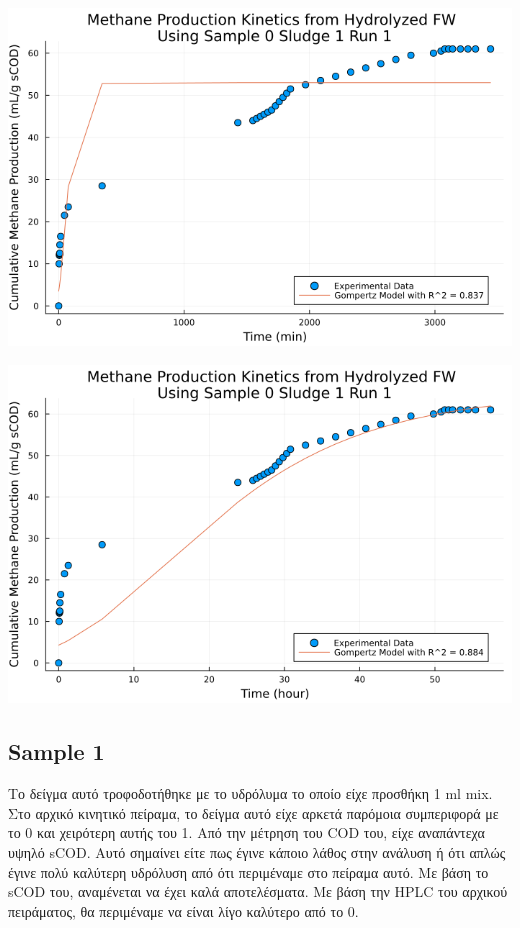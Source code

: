 \documentclass[11pt]{article}
\begin{document}
\begin{center}
\includegraphics[width=.9\linewidth]{../plots/BMPs/Hydrolyzed FW/methane_kinetics_hydrolysate_0_s1_r1_min.png}
\end{center}

\begin{center}
\includegraphics[width=.9\linewidth]{../plots/BMPs/Hydrolyzed FW/methane_kinetics_hydrolysate_0_s1_r1_hour.png}
\end{center}

\subsection{Sample 1}
\label{sec:org1a6b6a6}
Το δείγμα αυτό τροφοδοτήθηκε με το υδρόλυμα το οποίο είχε προσθήκη 1 ml mix. Στο αρχικό κινητικό πείραμα, το δείγμα αυτό είχε αρκετά παρόμοια συμπεριφορά με το 0 και χειρότερη αυτής του 1. Από την μέτρηση του COD του, είχε αναπάντεχα υψηλό sCOD. Αυτό σημαίνει είτε πως έγινε κάποιο λάθος στην ανάλυση ή ότι απλώς έγινε πολύ καλύτερη υδρόλυση από ότι περιμέναμε στο πείραμα αυτό. Με βάση το sCOD του, αναμένεται να έχει καλά αποτελέσματα. Με βάση την HPLC του αρχικού πειράματος, θα περιμέναμε να είναι λίγο καλύτερο από το 0.
\end{document}

